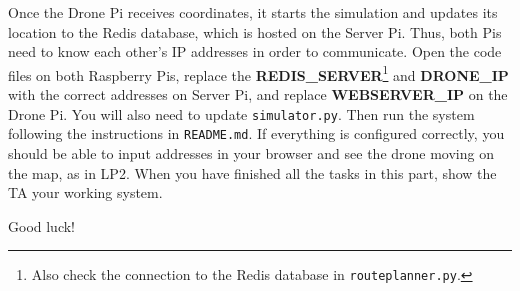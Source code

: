 \documentclass{article}
\begin{document}
\noindent Once the Drone Pi receives coordinates, it starts the simulation and updates its location to the Redis database, which is hosted on the Server Pi. Thus, both Pis need to know each other's IP addresses in order to communicate. Open the code files on both Raspberry Pis, replace the {\bf REDIS\_SERVER}\footnote{Also check the connection to the Redis database in \texttt{routeplanner.py}.} and {\bf DRONE\_IP} with the correct addresses on Server Pi, and replace {\bf WEBSERVER\_IP} on the Drone Pi. You will also need to update \texttt{simulator.py}. Then run the system following the instructions in \verb!README.md!. If everything is configured correctly, you should be able to input addresses in your browser and see the drone moving on the map, as in LP2. When you have finished all the tasks in this part, show the TA your working system.
\begin{center}
\huge Good luck!
\end{center}

% 




\end{document}
